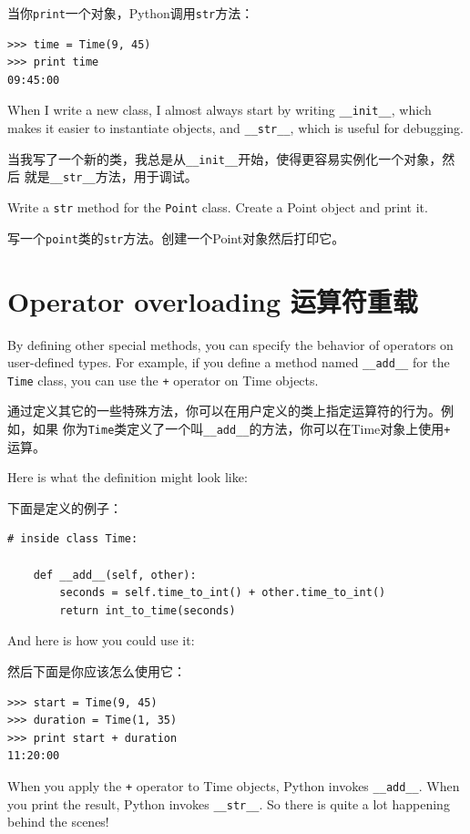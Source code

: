 \documentclass[10pt]{book}
\begin{document}
\begin{CJK}{UTF8}{gbsn}
当你{\tt print}一个对象，Python调用{\tt str}方法：

\begin{verbatim}
>>> time = Time(9, 45)
>>> print time
09:45:00
\end{verbatim}
%
When I write a new class, I almost always start by writing 
\verb"__init__", which makes it easier to instantiate objects, and 
\verb"__str__", which is useful for debugging.

当我写了一个新的类，我总是从\verb"__init__"开始，使得更容易实例化一个对象，然后
就是\verb"__str__"方法，用于调试。


\begin{exercise}

Write a {\tt str} method for the {\tt Point} class.  Create
a Point object and print it.

写一个{\tt point}类的{\tt str}方法。创建一个Point对象然后打印它。

\end{exercise}


\section{Operator overloading 运算符重载}
\label{operator.overloading}

By defining other special methods, you can specify the behavior
of operators on user-defined types.  For example, if you define
a method named \verb"__add__" for the {\tt Time} class, you can use the
{\tt +} operator on Time objects.

通过定义其它的一些特殊方法，你可以在用户定义的类上指定运算符的行为。例如，如果
你为{\tt Time}类定义了一个叫\verb"__add__"的方法，你可以在Time对象上使用{\tt +}
运算。

Here is what the definition might look like:

下面是定义的例子：

\begin{verbatim}
# inside class Time:

    def __add__(self, other):
        seconds = self.time_to_int() + other.time_to_int()
        return int_to_time(seconds)
\end{verbatim}
%
And here is how you could use it:

然后下面是你应该怎么使用它：

\begin{verbatim}
>>> start = Time(9, 45)
>>> duration = Time(1, 35)
>>> print start + duration
11:20:00
\end{verbatim}
%
When you apply the {\tt +} operator to Time objects, Python invokes
\verb"__add__".  When you print the result, Python invokes 
\verb"__str__".  So there is quite a lot happening behind the scenes!


\end{CJK}
\end{document}
